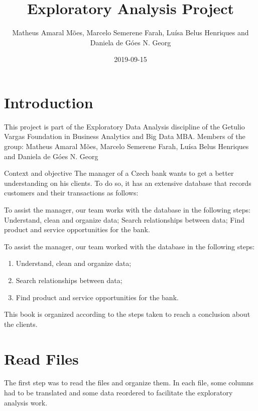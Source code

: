 \documentclass[]{book}
\title{Exploratory Analysis Project}
\author{Matheus Amaral Mões, Marcelo Semerene Farah, Luísa Belus Henriques and
Daniela de Góes N. Georg}
\date{2019-09-15}
\begin{document}
\maketitle

{
\setcounter{tocdepth}{1}
\tableofcontents
}
\chapter{Introduction}\label{introduction}

This project is part of the Exploratory Data Analysis discipline of the
Getulio Vargas Foundation in Business Analytics and Big Data MBA.
Members of the group: Matheus Amaral Mões, Marcelo Semerene Farah, Luísa
Belus Henriques and Daniela de Góes N. Georg

Context and objective The manager of a Czech bank wants to get a better
understanding on his clients. To do so, it has an extensive database
that records customers and their transactions as follows:

To assist the manager, our team works with the database in the following
steps: Understand, clean and organize data; Search relationships between
data; Find product and service opportunities for the bank.

To assist the manager, our team worked with the database in the
following steps:

\begin{enumerate}
\def\labelenumi{\arabic{enumi}.}
\item
  Understand, clean and organize data;
\item
  Search relationships between data;
\item
  Find product and service opportunities for the bank.
\end{enumerate}

This book is organized according to the steps taken to reach a
conclusion about the clients.

\chapter{Read Files}\label{read-files}

The first step was to read the files and organize them. In each file,
some columns had to be translated and some data reordered to facilitate
the exploratory analysis work.
\end{document}
